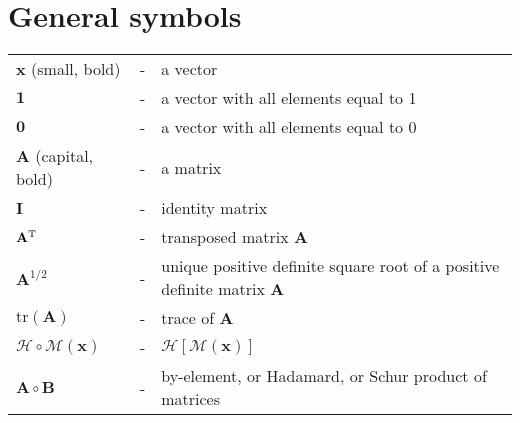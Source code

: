 \documentclass[11pt]{report}
\newcommand{\mb} {\mathbf}
\newcommand{\T}{^{\tiny \mathrm T}}
\begin{document}
\section*{General symbols}
\begin{tabular}{lll}
  $\mb x$ (small, bold) &-& a vector \\
  $\mb 1$ &-& a vector with all elements equal to 1 \\
  $\mb 0$ &-& a vector with all elements equal to 0 \\
  $\mb A$ (capital, bold) &-& a matrix \\
  $\mb I$ &-& identity matrix \\
  $\mb A\T$ &-& transposed matrix $\mb A$ \\
  $\mb A^{1/2}$ &-& unique positive definite square root of a positive definite matrix $\mb A$ \\
  $\mathrm{tr}(\mb A)$ &-& trace of $\mb A$ \\
  $\mathcal H \circ \mathcal M(\mb x)$ &-& $\mathcal H \left[ \mathcal M (\mb x) \right]$ \\
  $\mb A \circ \mb B$ &-& by-element, or Hadamard, or Schur product of matrices
\end{tabular}
\end{document}
